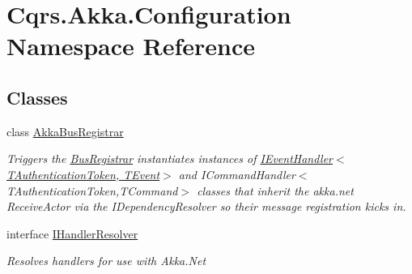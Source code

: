 \hypertarget{namespaceCqrs_1_1Akka_1_1Configuration}{}\section{Cqrs.\+Akka.\+Configuration Namespace Reference}
\label{namespaceCqrs_1_1Akka_1_1Configuration}
\subsection*{Classes}
\begin{DoxyCompactItemize}
\item 
class \hyperlink{classCqrs_1_1Akka_1_1Configuration_1_1AkkaBusRegistrar}{Akka\+Bus\+Registrar}
\begin{DoxyCompactList}\small\item\em Triggers the \hyperlink{classCqrs_1_1Configuration_1_1BusRegistrar_a4a934d21a535b28af6c67154512bba20_a4a934d21a535b28af6c67154512bba20}{Bus\+Registrar} instantiates instances of \hyperlink{interfaceCqrs_1_1Events_1_1IEventHandler}{I\+Event\+Handler$<$\+T\+Authentication\+Token, T\+Event$>$} and I\+Command\+Handler$<$\+T\+Authentication\+Token,\+T\+Command$>$ classes that inherit the akka.\+net Receive\+Actor via the I\+Dependency\+Resolver so their message registration kicks in. \end{DoxyCompactList}\item 
interface \hyperlink{interfaceCqrs_1_1Akka_1_1Configuration_1_1IHandlerResolver}{I\+Handler\+Resolver}
\begin{DoxyCompactList}\small\item\em Resolves handlers for use with Akka.\+Net \end{DoxyCompactList}\end{DoxyCompactItemize}

